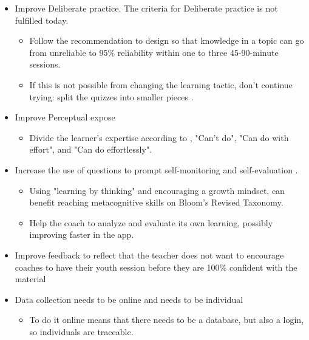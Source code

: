   \begin{itemize}
    \item Improve Deliberate practice. The criteria for Deliberate practice is not fulfilled today.
    \begin{itemize}
      \item  Follow the recommendation to design so that knowledge in a topic can go from unreliable to 95\% reliability within one to three 45-90-minute sessions.
      \item If this is not possible from changing the learning tactic, don't continue trying: split the quizzes into smaller pieces \citep{sierra}.
    \end{itemize}
    \item Improve Perceptual expose
    \begin{itemize}
      \item Divide the learner's expertise according to \cite{sierra}, "Can't do", "Can do with effort", and "Can do effortlessly".
    \end{itemize}
    \item Increase the use of questions to prompt self-monitoring  and self-evaluation \citep{sitzmann}.
    \begin{itemize}
      \item Using "learning by thinking" and encouraging a growth mindset, can benefit reaching metacognitive skills on Bloom's Revised Taxonomy.
      \item Help the coach to analyze and evaluate its own learning, possibly improving faster in the app.
    \end{itemize}
    \item Improve feedback to reflect that the teacher does not want to encourage coaches to have their youth session before they are 100\% confident with the material
    \item Data collection needs to be online and needs to be individual
    \begin{itemize}
      \item To do it online means that there needs to be a database, but also a login, so individuals are traceable.
    \end{itemize}
  \end{itemize}
